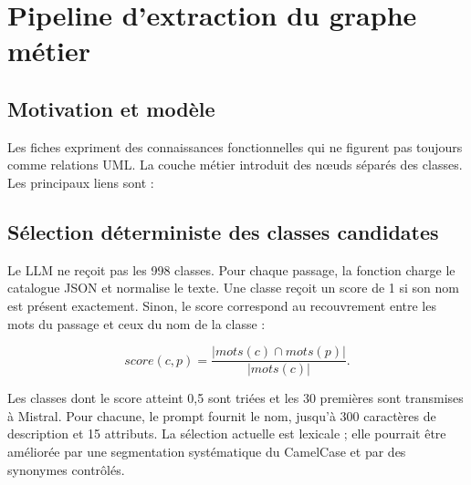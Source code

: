 \chapter{Pipeline d'extraction du graphe métier}

\section{Motivation et modèle}

Les fiches expriment des connaissances fonctionnelles qui ne figurent pas toujours comme relations UML. La couche métier introduit des nœuds  séparés des classes. Les principaux liens sont :

\begin{center}
\end{center}

\section{Sélection déterministe des classes candidates}

Le LLM ne reçoit pas les 998 classes. Pour chaque passage, la fonction  charge le catalogue JSON et normalise le texte. Une classe reçoit un score de 1 si son nom est présent exactement. Sinon, le score correspond au recouvrement entre les mots du passage et ceux du nom de la classe :

\begin{equation}
score(c,p)=\frac{|mots(c)\cap mots(p)|}{|mots(c)|}.
\end{equation}

Les classes dont le score atteint 0,5 sont triées et les 30 premières sont transmises à Mistral. Pour chacune, le prompt fournit le nom, jusqu'à 300 caractères de description et 15 attributs. La sélection actuelle est lexicale ; elle pourrait être améliorée par une segmentation systématique du CamelCase et par des synonymes contrôlés.

